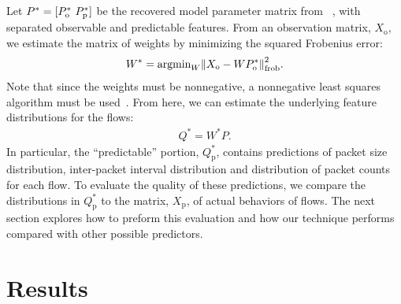 \documentclass{acm_proc_article-sp}
\begin{document}

Let $P^* = {[P^*_\text{o}~P^*_\text{p}]}$ be the recovered model parameter matrix from ~, with separated observable and predictable features.\separationnote
From an observation matrix, $X_\text{o}$, we estimate the matrix of weights by minimizing the squared Frobenius error:
\begin{align}
  W^* = \text{argmin}_W {{\left\lVert X_\text{o} - W P^*_\text{o}\right\rVert}^2_\text{frob}}.
\end{align}
Note that since the weights must be nonnegative, a nonnegative least squares algorithm must be used~\cite{Benthem04,Kim08:block-pivot}.
From here, we can estimate the underlying feature distributions for the flows:
\begin{align}
  Q^* = W^*P.
\end{align}
In particular, the ``predictable'' portion, $Q^*_\text{p}$, contains predictions of packet size distribution, inter-packet interval distribution and distribution of packet counts for each flow.
To evaluate the quality of these predictions, we compare the distributions in $Q^*_\text{p}$ to the matrix, $X_\text{p}$, of actual behaviors of flows.
The next section explores how to preform this evaluation and how our technique performs compared with other possible predictors. 

\section{Results}
\end{document}

